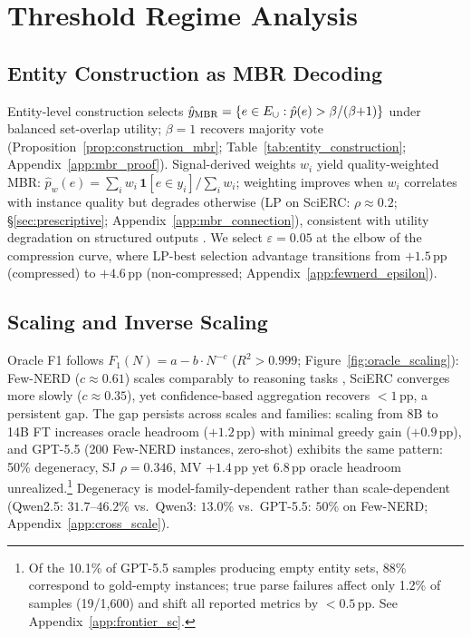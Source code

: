 \section{Threshold Regime Analysis}\label{sec:theory_scaling}

\subsection{Entity Construction as MBR Decoding}\label{sec:mbr_theory}

Entity-level construction selects $\hat{y}_{\textup{MBR}} = \{e \in E_\cup : \hat{p}(e) > \beta/(\beta{+}1)\}$ under balanced set-overlap utility; $\beta{=}1$ recovers majority vote (Proposition~\ref{prop:construction_mbr}; Table~\ref{tab:entity_construction}; Appendix~\ref{app:mbr_proof}).
Signal-derived weights $w_i$ yield quality-weighted MBR: $\hat{p}_w(e) = \sum_{i} w_i \, \mathbf{1}[e {\in} y_i] / \sum_{i} w_i$; weighting improves when $w_i$ correlates with instance quality but degrades otherwise (LP on SciERC: $\rho{\approx}0.2$; \S\ref{sec:prescriptive}; Appendix~\ref{app:mbr_connection}), consistent with utility degradation on structured outputs \cite{eikema2025structured}.
We select $\varepsilon{=}0.05$ at the elbow of the compression curve, where LP-best selection advantage transitions from $+1.5$\,pp (compressed) to $+4.6$\,pp (non-compressed; Appendix~\ref{app:fewnerd_epsilon}).

\subsection{Scaling and Inverse Scaling}\label{sec:scaling}

Oracle F1 follows $F_1(N) = a - b \cdot N^{-c}$ ($R^2 > 0.999$; Figure~\ref{fig:oracle_scaling}): Few-NERD ($c{\approx}0.61$) scales comparably to reasoning tasks \cite{brown2024monkeys}, SciERC converges more slowly ($c{\approx}0.35$), yet confidence-based aggregation recovers ${<}1$\,pp, a persistent gap.
The gap persists across scales and families: scaling from 8B to 14B FT increases oracle headroom ($+1.2$\,pp) with minimal greedy gain ($+0.9$\,pp), and GPT-5.5 (200 Few-NERD instances, zero-shot) exhibits the same pattern: 50\% degeneracy, SJ $\rho{=}0.346$, MV $+1.4$\,pp yet 6.8\,pp oracle headroom unrealized.\footnote{Of the 10.1\% of GPT-5.5 samples producing empty entity sets, 88\% correspond to gold-empty instances; true parse failures affect only 1.2\% of samples (19/1{,}600) and shift all reported metrics by ${<}0.5$\,pp. See Appendix~\ref{app:frontier_sc}.}
Degeneracy is model-family-dependent rather than scale-dependent (Qwen2.5: $31.7$--$46.2$\% vs.\ Qwen3: $13.0$\% vs.\ GPT-5.5: $50$\% on Few-NERD; Appendix~\ref{app:cross_scale}).


